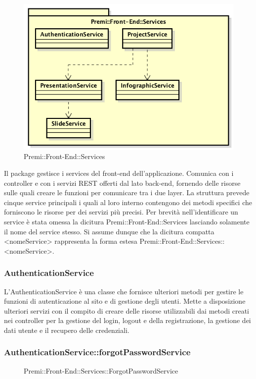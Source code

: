 \begin{figure}[h]
	\centering
	\includegraphics[width=0.7\linewidth]{img/premi_front_end_services}
	\caption[Premi::Front-End::Services]{Premi::Front-End::Services}
\end{figure}
Il package gestisce i services del front-end dell'applicazione. Comunica con i controller e con i servizi REST offerti dal lato back-end, fornendo delle risorse sulle quali creare le funzioni per comunicare tra i due layer. La struttura prevede cinque service principali i quali al loro interno contengono dei metodi specifici che forniscono le risorse per dei servizi più precisi.
Per brevità nell'identificare un service è stata omessa la dicitura Premi::Front-End::Services lasciando solamente il nome del service stesso. Si assume dunque che la dicitura compatta <nomeService> rappresenta la forma estesa Premi::Front-End::Services::<nomeService>.


\subsubsection{AuthenticationService}
L'AuthenticationService è una classe che fornisce ulteriori metodi per gestire le funzioni di autenticazione al sito e di gestione degli utenti. Mette a disposizione ulteriori servizi con il compito di creare delle risorse utilizzabili dai metodi creati nei controller per la gestione del login, logout e della registrazione, la gestione dei dati utente e il recupero delle credenziali.

		\subsubsection{AuthenticationService::forgotPasswordService}
		\begin{figure}[h]
			\centering
			\caption[Premi::Front-End::Services::ForgotPasswordService]{Premi::Front-End::Services::ForgotPasswordService}
		\end{figure}
		
